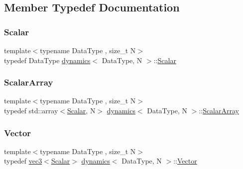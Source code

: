 \subsection{Member Typedef Documentation}
\mbox{\label{classdynamics_a444c7534e86115117798563cb0e43cde}} 
\subsubsection{\texorpdfstring{Scalar}{Scalar}}
{\footnotesize\ttfamily template$<$typename Data\+Type , size\+\_\+t N$>$ \\
typedef Data\+Type \mbox{\hyperlink{classdynamics}{dynamics}}$<$ Data\+Type, N $>$\+::\mbox{\hyperlink{classdynamics_a444c7534e86115117798563cb0e43cde}{Scalar}}}

\mbox{\label{classdynamics_ac31f831ea1577092662dafd2daba0f48}} 
\subsubsection{\texorpdfstring{Scalar\+Array}{ScalarArray}}
{\footnotesize\ttfamily template$<$typename Data\+Type , size\+\_\+t N$>$ \\
typedef std\+::array$<$\mbox{\hyperlink{classdynamics_a444c7534e86115117798563cb0e43cde}{Scalar}}, N$>$ \mbox{\hyperlink{classdynamics}{dynamics}}$<$ Data\+Type, N $>$\+::\mbox{\hyperlink{classdynamics_ac31f831ea1577092662dafd2daba0f48}{Scalar\+Array}}}

\mbox{\label{classdynamics_a9ba7c016128ac3a2eb51f7bcfbf90243}} 
\subsubsection{\texorpdfstring{Vector}{Vector}}
{\footnotesize\ttfamily template$<$typename Data\+Type , size\+\_\+t N$>$ \\
typedef \mbox{\hyperlink{structvec3}{vec3}}$<$\mbox{\hyperlink{classdynamics_a444c7534e86115117798563cb0e43cde}{Scalar}}$>$ \mbox{\hyperlink{classdynamics}{dynamics}}$<$ Data\+Type, N $>$\+::\mbox{\hyperlink{classdynamics_a9ba7c016128ac3a2eb51f7bcfbf90243}{Vector}}}

